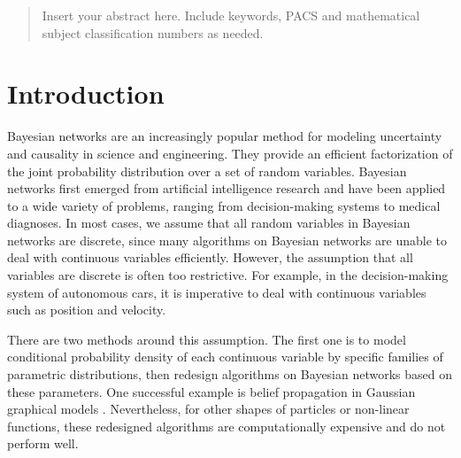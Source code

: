 

\date{Received: date / Accepted: date}


\maketitle

\begin{abstract}
Insert your abstract here. Include keywords, PACS and mathematical
subject classification numbers as needed.
\end{abstract}

\section{Introduction}
\label{intro}
Bayesian networks \citep{Pearl_1988, PGM_2009}  are an increasingly popular method for modeling uncertainty and causality in science and engineering. They provide an efficient factorization of the joint probability distribution over a set of random variables. Bayesian networks first emerged from artificial intelligence research and have been applied to a wide variety of problems, ranging from decision-making systems \citep{DMU_2015} to medical diagnoses. In most cases, we assume that all random variables in Bayesian networks are discrete, since many algorithms on Bayesian networks are unable to deal with continuous variables efficiently. However, the assumption that all variables are discrete is often too restrictive. For example, in the decision-making system of autonomous cars, it is imperative to deal with continuous variables such as position and velocity.

There are two methods around this assumption. The first one is to model conditional probability density of each continuous variable by specific families of parametric distributions, then redesign algorithms on Bayesian networks based on these parameters. One successful example is belief propagation in Gaussian graphical models \citep{Weiss_2011}. Nevertheless, for other shapes of particles \citep{Ihler_2009} or non-linear functions, these redesigned algorithms are computationally expensive and do not perform well.

